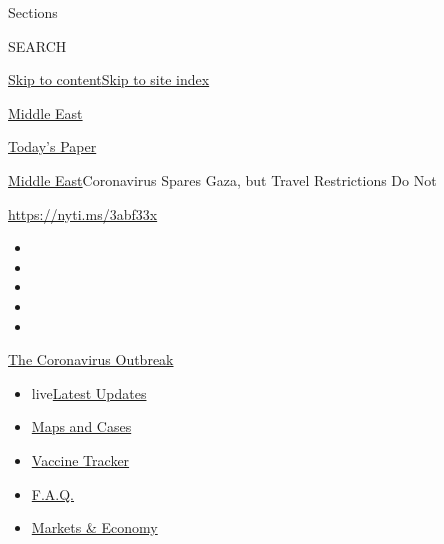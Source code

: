 Sections

SEARCH

\protect\hyperlink{site-content}{Skip to
content}\protect\hyperlink{site-index}{Skip to site index}

\href{https://www.nytimes.com/section/world/middleeast}{Middle East}

\href{https://myaccount.nytimes.com/auth/login?response_type=cookie\&client_id=vi}{}

\href{https://www.nytimes.com/section/todayspaper}{Today's Paper}

\href{/section/world/middleeast}{Middle East}\textbar{}Coronavirus
Spares Gaza, but Travel Restrictions Do Not

\href{https://nyti.ms/3abf33x}{https://nyti.ms/3abf33x}

\begin{itemize}
\item
\item
\item
\item
\item
\end{itemize}

\href{https://www.nytimes.com/news-event/coronavirus?action=click\&pgtype=Article\&state=default\&region=TOP_BANNER\&context=storylines_menu}{The
Coronavirus Outbreak}

\begin{itemize}
\tightlist
\item
  live\href{https://www.nytimes.com/2020/08/08/world/coronavirus-updates.html?action=click\&pgtype=Article\&state=default\&region=TOP_BANNER\&context=storylines_menu}{Latest
  Updates}
\item
  \href{https://www.nytimes.com/interactive/2020/us/coronavirus-us-cases.html?action=click\&pgtype=Article\&state=default\&region=TOP_BANNER\&context=storylines_menu}{Maps
  and Cases}
\item
  \href{https://www.nytimes.com/interactive/2020/science/coronavirus-vaccine-tracker.html?action=click\&pgtype=Article\&state=default\&region=TOP_BANNER\&context=storylines_menu}{Vaccine
  Tracker}
\item
  \href{https://www.nytimes.com/interactive/2020/world/coronavirus-tips-advice.html?action=click\&pgtype=Article\&state=default\&region=TOP_BANNER\&context=storylines_menu}{F.A.Q.}
\item
  \href{https://www.nytimes.com/live/2020/08/07/business/stock-market-today-coronavirus?action=click\&pgtype=Article\&state=default\&region=TOP_BANNER\&context=storylines_menu}{Markets
  \& Economy}
\end{itemize}

